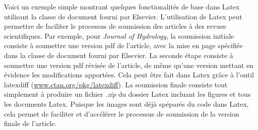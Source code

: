 \documentclass[Master.tex]{subfiles}
\begin{document}
Voici un exemple simple montrant quelques fonctionalités de base dans Latex utilisant la classe de document fourni par Elsevier. L'utilisation de Latex peut permettre de faciliter le processus de soumission des articles à des revues scientifiques. Par exemple, pour \emph{Journal of Hydrology}, la soumission initiale consiste à soumettre une version pdf de l'article, avec la mise en page spécifiée dans la classe de document fourni par Elsevier. La seconde étape consiste à soumettre une version pdf révisée de l'article, de même qu'une version mettant en évidence les modifications apportées. Cela peut être fait dans Latex grâce à l'outil latexdiff (\url{www.ctan.org/pkg/latexdiff}). La soumission finale consiste tout simplement à produire un fichier \emph{.zip} du dossier Latex incluant les figures et tous les documents Latex. Puisque les images sont déjà spéparés du code dans Latex, cela permet de faciliter et d'accélérer le processus de soumission de la version finale de l'article.
\end{document}
